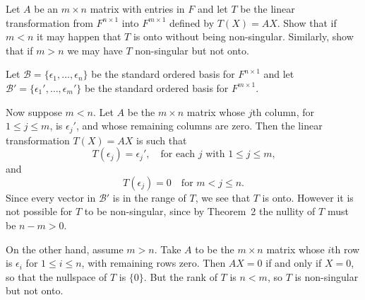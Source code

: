 Let $A$ be an $m\times n$ matrix with entries in $F$ and
let $T$ be the linear transformation from $F^{n\times1}$ into
$F^{m\times1}$ defined by $T(X) = AX$. Show that if $m < n$ it may
happen that $T$ is onto without being non-singular. Similarly, show
that if $m > n$ we may have $T$ non-singular but not onto.
\begin{solution}
  Let $\mathcal{B} = \{\epsilon_1,\dots,\epsilon_n\}$ be the standard
  ordered basis for $F^{n\times1}$ and let
  $\mathcal{B}' = \{\epsilon_1',\dots,\epsilon_m'\}$ be the standard
  ordered basis for $F^{m\times1}$.

  Now suppose $m < n$. Let $A$ be the $m\times n$ matrix whose $j$th
  column, for $1\leq j\leq m$, is $\epsilon_j'$, and whose remaining
  columns are zero. Then the linear transformation $T(X) = AX$ is such
  that
  \begin{equation*}
    T(\epsilon_j) = \epsilon_j', \quad
    \text{for each $j$ with $1\leq j\leq m$,}
  \end{equation*}
  and
  \begin{equation*}
    T(\epsilon_j) = 0 \quad
    \text{for $m<j\leq n$.}
  \end{equation*}
  Since every vector in $\mathcal{B}'$ is in the range of $T$, we see
  that $T$ is onto. However it is not possible for $T$ to be
  non-singular, since by Theorem~2 the nullity of $T$ must be
  $n - m > 0$.

  On the other hand, assume $m > n$. Take $A$ to be the $m\times n$
  matrix whose $i$th row is $\epsilon_i$ for $1\leq i\leq n$, with
  remaining rows zero. Then $AX = 0$ if and only if $X = 0$, so that
  the nullspace of $T$ is $\{0\}$. But the rank of $T$ is $n < m$, so
  $T$ is non-singular but not onto.
\end{solution}
